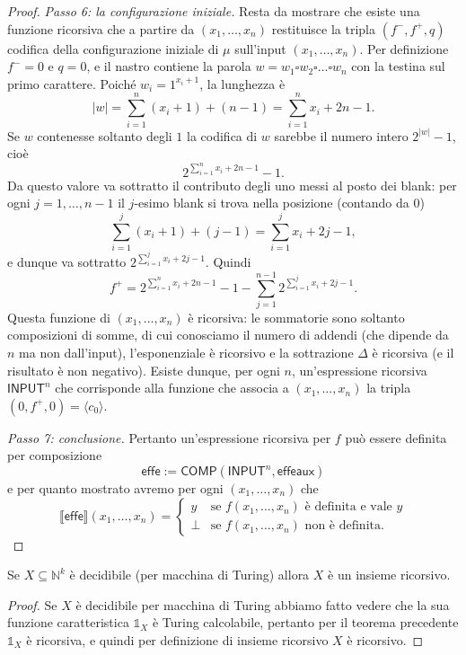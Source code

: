 \begin{proof}
\medskip
\noindent\emph{Passo 6: la configurazione iniziale.}
Resta da mostrare che esiste una funzione ricorsiva che a partire da $(x_1,\dots,x_n)$ restituisce la tripla $(f^-,f^+,q)$ codifica della configurazione iniziale di $\mu$ sull'input $(x_1,\dots,x_n)$. Per definizione $f^-=0$ e $q=0$, e il nastro contiene la parola $w=w_1\square w_2\square\dots\square w_n$ con la testina sul primo carattere. Poiché $w_i=1^{x_i+1}$, la lunghezza è
\[
|w|=\sum_{i=1}^n(x_i+1)+(n-1)=\sum_{i=1}^nx_i+2n-1.
\]
Se $w$ contenesse soltanto degli $1$ la codifica di $w$ sarebbe il numero intero $2^{|w|}-1$, cioè
\[
2^{\sum_{i=1}^nx_i+2n-1}-1.
\]
Da questo valore va sottratto il contributo degli uno messi al posto dei blank: per ogni $j=1,\dots,n-1$ il $j$-esimo blank si trova nella posizione (contando da $0$)
\[
\sum_{i=1}^j(x_i+1)+(j-1)=\sum_{i=1}^jx_i+2j-1,
\]
e dunque va sottratto $2^{\sum_{i=1}^jx_i+2j-1}$. Quindi
\[
f^+=2^{\sum_{i=1}^nx_i+2n-1}-1-\sum_{j=1}^{n-1}2^{\sum_{i=1}^jx_i+2j-1}.
\]
Questa funzione di $(x_1,\dots,x_n)$ è ricorsiva: le sommatorie sono soltanto composizioni di somme, di cui conosciamo il numero di addendi (che dipende da $n$ ma non dall'input), l'esponenziale è ricorsivo e la sottrazione $\Delta$ è ricorsiva (e il risultato è non negativo). Esiste dunque, per ogni $n$, un'espressione ricorsiva $\mathsf{INPUT}^n$ che corrisponde alla funzione che associa a $(x_1,\dots,x_n)$ la tripla $(0,f^+,0)=\langle c_0\rangle$.

\medskip
\noindent\emph{Passo 7: conclusione.}
Pertanto un'espressione ricorsiva per $f$ può essere definita per composizione
\[
\mathsf{effe}:=\mathsf{COMP}(\mathsf{INPUT}^n,\mathsf{effeaux})
\]
e per quanto mostrato avremo per ogni $(x_1,\dots,x_n)$ che
\[
\llbracket\mathsf{effe}\rrbracket(x_1,\dots,x_n)=
\begin{cases}
y & \text{se } f(x_1,\dots,x_n) \text{ è definita e vale } y\\
\bot & \text{se } f(x_1,\dots,x_n) \text{ non è definita.}
\end{cases}
\]
\end{proof}

\begin{coro}
Se $X\subseteq\mathbb N^k$ è decidibile (per macchina di Turing) allora $X$ è un insieme ricorsivo.
\end{coro}

\begin{proof}
Se $X$ è decidibile per macchina di Turing abbiamo fatto vedere che la sua funzione caratteristica $\mathbb 1_X$ è Turing calcolabile, pertanto per il teorema precedente $\mathbb 1_X$ è ricorsiva, e quindi per definizione di insieme ricorsivo $X$ è ricorsivo.
\end{proof}

